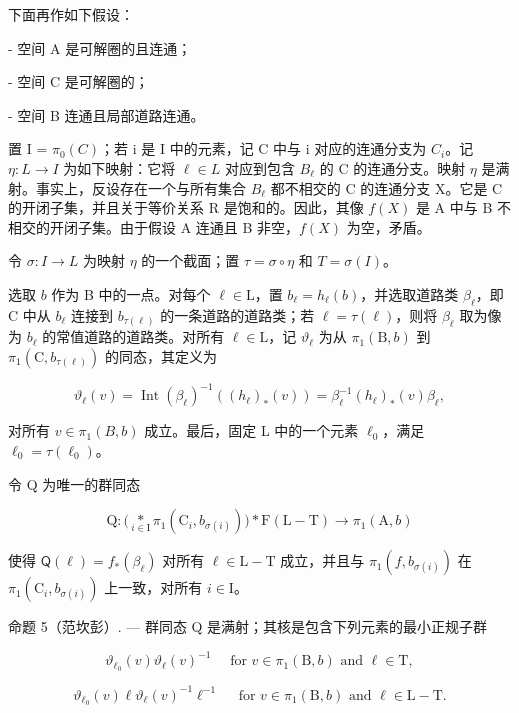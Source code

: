 下面再作如下假设：

- 空间 A 是可解圈的且连通；

- 空间 C 是可解圈的；

- 空间 B 连通且局部道路连通。

置 I = \(\pi_{0}(C)\)；若 i 是 I 中的元素，记 C 中与 i 对应的连通分支为 \(C_{i}\)。记 \(\eta: L \rightarrow I\) 为如下映射：它将 \(\ell \in L\) 对应到包含 \(B_{\ell}\) 的 C 的连通分支。映射 \(\eta\) 是满射。事实上，反设存在一个与所有集合 \(B_{\ell}\) 都不相交的 C 的连通分支 X。它是 C 的开闭子集，并且关于等价关系 R 是饱和的。因此，其像 \(f(X)\) 是 A 中与 B 不相交的开闭子集。由于假设 A 连通且 B 非空，\(f(X)\) 为空，矛盾。

令 \(\sigma\colon I\to L\) 为映射 \(\eta\) 的一个截面；置 \(\tau=\sigma\circ\eta\) 和 \(T=\sigma(I)\)。

选取 \(b\) 作为 B 中的一点。对每个 \(\ell \in \mathrm{L}\)，置 \(b_{\ell} = h_{\ell}(b)\)，并选取道路类 \(\beta_{\ell}\)，即 C 中从 \(b_{\ell}\) 连接到 \(b_{\tau(\ell)}\) 的一条道路的道路类；若 \(\ell = \tau(\ell)\)，则将 \(\beta_{\ell}\) 取为像为 \(b_{\ell}\) 的常值道路的道路类。对所有 \(\ell \in \mathrm{L}\)，记 \(\vartheta_{\ell}\) 为从 \(\pi_1(\mathrm{B}, b)\) 到 \(\pi_1(\mathrm{C}, b_{\tau(\ell)})\) 的同态，其定义为

\[
\vartheta_ {\ell} (v) = \operatorname{Int} (\beta_ {\ell}) ^ {- 1} ((h _ {\ell}) _ {*} (v)) = \beta_ {\ell} ^ {- 1} (h _ {\ell}) _ {*} (v) \beta_ {\ell},
\]

对所有 \(v \in \pi_{1}(B, b)\) 成立。最后，固定 L 中的一个元素 \(\ell_{0}\)，满足 \(\ell_{0} = \tau(\ell_{0})\)。

令 Q 为唯一的群同态

\[
\mathrm{Q} \colon \big (\underset {i \in \mathrm{I}} {*} \pi_ {1} (\mathrm{C} _ {i}, b _ {\sigma (i)}) \big) * \mathrm{F} (\mathrm{L} - \mathrm{T}) \to \pi_ {1} (\mathrm{A}, b)
\]

使得 \(\mathsf{Q}(\ell) = f_{*}(\beta_{\ell})\) 对所有 \(\ell \in \mathrm{L} - \mathrm{T}\) 成立，并且与 \(\pi_1(f, b_{\sigma(i)})\) 在 \(\pi_1(\mathrm{C}_i, b_{\sigma(i)})\) 上一致，对所有 \(i \in \mathrm{I}\)。

命题 5（范坎彭）. --- 群同态 Q 是满射；其核是包含下列元素的最小正规子群

\[
\vartheta_ {\ell_ {0}} (v) \vartheta_ {\ell} (v) ^ {- 1} \quad \text { for } v \in \pi_ {1} (\mathrm{B}, b) \text { and } \ell \in \mathrm{T},
\]

\[
\vartheta_ {\ell_ {0}} (v) \ell \vartheta_ {\ell} (v) ^ {- 1} \ell^ {- 1} \quad \text { for } v \in \pi_ {1} (\mathrm{B}, b) \text { and } \ell \in \mathrm{L} - \mathrm{T}.
\]

